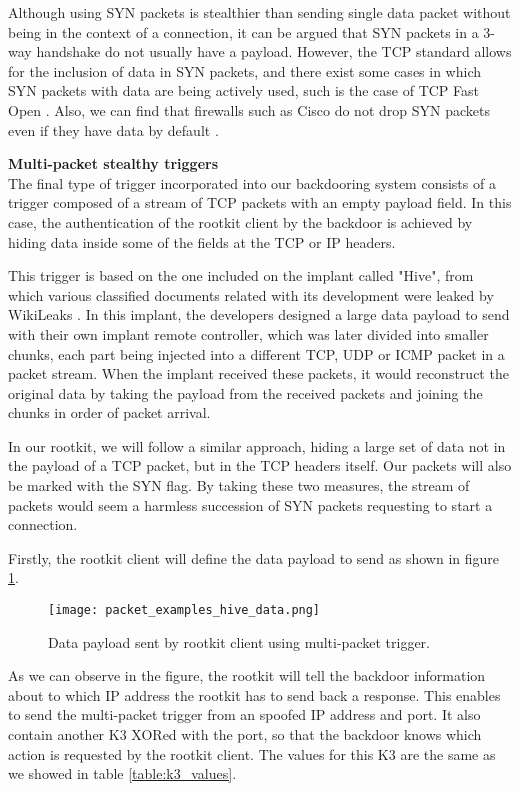 Although using SYN packets is stealthier than sending single data packet without being in the context of a connection, it can be argued that SYN packets in a 3-way handshake do not usually have a payload. However, the TCP standard allows for the inclusion of data in SYN packets, and there exist some cases in which SYN packets with data are being actively used, such is the case of TCP Fast Open \cite{tcp_syn_payload} \cite{rfc_tcp4}. Also, we can find that firewalls such as Cisco do not drop SYN packets even if they have data by default \cite{cisco_syn_firewall}.


\textbf{Multi-packet stealthy triggers}\\
The final type of trigger incorporated into our backdooring system consists of a trigger composed of a stream of TCP packets with an empty payload field. In this case, the authentication of the rootkit client by the backdoor is achieved by hiding data inside some of the fields at the TCP or IP headers. 

This trigger is based on the one included on the implant called "Hive", from which various classified documents related with its development were leaked by WikiLeaks \cite{hive_implant}. In this implant, the developers designed a large data payload to send with their own implant remote controller, which was later divided into smaller chunks, each part being injected into a different TCP, UDP or ICMP packet in a packet stream. When the implant received these packets, it would reconstruct the original data by taking the payload from the received packets and joining the chunks in order of packet arrival.

In our rootkit, we will follow a similar approach, hiding a large set of data not in the payload of a TCP packet, but in the TCP headers itself. Our packets will also be marked with the SYN flag. By taking these two measures, the stream of packets would seem a harmless succession of SYN packets requesting to start a connection.

Firstly, the rootkit client will define the data payload to send as shown in figure \ref{fig:hive_data}.

\begin{figure}[htbp]
	\centering
	\texttt{[image: packet\_examples\_hive\_data.png]}
	\caption{Data payload sent by rootkit client using multi-packet trigger.}
	\label{fig:hive_data}
\end{figure}

As we can observe in the figure, the rootkit will tell the backdoor information about to which IP address the rootkit has to send back a response. This enables to send the multi-packet trigger from an spoofed IP address and port. It also contain another K3 XORed with the port, so that the backdoor knows which action is requested by the rootkit client. The values for this K3 are the same as we showed in table \ref{table:k3_values}.

